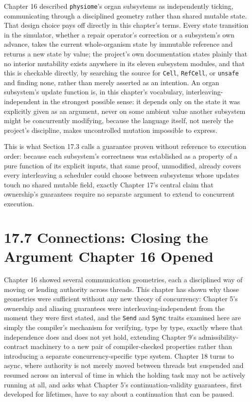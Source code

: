 \documentclass[11pt]{book}
\begin{document}
Chapter 16 described \texttt{physiome}'s organ subsystems as independently ticking, communicating through a disciplined geometry rather than shared mutable state. That design choice pays off directly in this chapter's terms. Every state transition in the simulator, whether a repair operator's correction or a subsystem's own advance, takes the current whole-organism state by immutable reference and returns a new state by value; the project's own documentation states plainly that no interior mutability exists anywhere in its eleven subsystem modules, and that this is checkable directly, by searching the source for \texttt{Cell}, \texttt{RefCell}, or \texttt{unsafe} and finding none, rather than merely asserted as an intention. An organ subsystem's update function is, in this chapter's vocabulary, interleaving-independent in the strongest possible sense: it depends only on the state it was explicitly given as an argument, never on some ambient value another subsystem might be concurrently modifying, because the language itself, not merely the project's discipline, makes uncontrolled mutation impossible to express.

This is what Section 17.3 calls a guarantee proven without reference to execution order: because each subsystem's correctness was established as a property of a pure function of its explicit inputs, that same proof, unmodified, already covers every interleaving a scheduler could choose between subsystems whose updates touch no shared mutable field, exactly Chapter 17's central claim that ownership's guarantees require no separate argument to extend to concurrent execution.

\section*{17.7 Connections: Closing the Argument Chapter 16 Opened}

Chapter 16 showed several communication geometries, each a disciplined way of moving or lending authority across threads. This chapter has shown why those geometries were sufficient without any new theory of concurrency: Chapter 5's ownership and aliasing guarantees were interleaving-independent from the moment they were first stated, and the \texttt{Send} and \texttt{Sync} traits examined here are simply the compiler's mechanism for verifying, type by type, exactly where that independence does and does not yet hold, extending Chapter 9's admissibility-contract machinery to a new pair of compiler-checked properties rather than introducing a separate concurrency-specific type system. Chapter 18 turns to async, where authority is not merely moved between threads but suspended and resumed across an interval of time in which the holding task may not be actively running at all, and asks what Chapter 5's continuation-validity guarantees, first developed for lifetimes, have to say about a continuation that can be paused.
\end{document}
